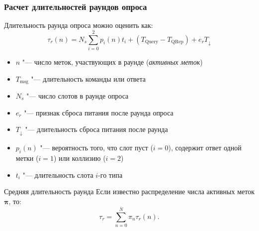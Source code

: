\begin{frame}
    \frametitle{Расчет длительностей раундов опроса}
    Длительность раунда опроса можно оценить как:
    $$
    \tau_r(n) = N_s \sum\limits_{i=0}^{2}p_i(n)t_i +
		(T_\text{Query} - T_\text{QRep}) +
		e_r T_\downarrow
    $$
    \footnotesize
    \begin{itemize}
        \item $n$ "--- число меток, участвующих в раунде (\textit{активных меток})
        \item $T_{\text{msg}}$ "--- длительность команды или ответа
        \item $N_s$ "--- число слотов в раунде опроса
        \item $e_r$ "--- признак сброса питания после раунда опроса
        \item $T_\downarrow$ "--- длительность сброса питания после раунда
        \item $p_i(n)$ "--- вероятность того, что слот пуст ($i = 0$), содержит ответ одной метки ($i = 1$) или коллизию ($i = 2$)
        \item $t_i$ "--- длительность слота $i$-го типа
    \end{itemize}
    \begin{block}{Средняя длительность раунда}
        Если известно распределение числа активных меток $\bm{\pi}$, то:
        $$
        \tau_r = \sum\limits_{n=0}^{\overline{N}} \pi_n \tau_r(n).
        $$
    \end{block}
\end{frame}


